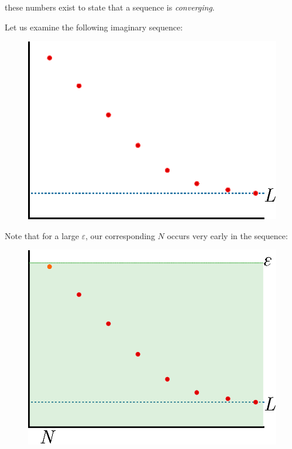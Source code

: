   these numbers exist to state that a sequence is \emph{converging}.
\begin{ex}
  Let us examine the following imaginary sequence:
  \begin{figure}[H]
    \begin{center}
      \includegraphics[scale=0.5]{continuous/sequence/conv1}
    \end{center}
    \label{fig:conv1}
  \end{figure}
  Note that for a large $\varepsilon$, our corresponding $N$ occurs very early in the sequence:
  \begin{figure}[H]
    \begin{center}
      \includegraphics[scale=0.5]{continuous/sequence/conv2}

\end{center}
\end{figure}
\end{ex}
